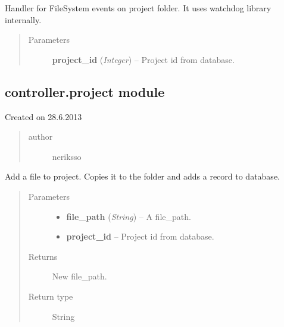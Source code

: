 \documentclass[letterpaper,10pt,english]{sphinxmanual}
\begin{document}
\begin{fulllineitems}
\label{controller:controller.handlers.PROJECT_EVENT_HANDLER}
Handler for FileSystem events on project folder.
It uses watchdog library internally.
\begin{quote}\begin{description}
\item[{Parameters}] \leavevmode
\textbf{project\_id} (\emph{Integer}) -- Project id from database.

\end{description}\end{quote}

\end{fulllineitems}



\subsection{controller.project module}
\label{controller:controller-project-module}\label{controller:module-controller.project}
Created on 28.6.2013
\begin{quote}\begin{description}
\item[{author}] \leavevmode
neriksso

\end{description}\end{quote}

\begin{fulllineitems}
\label{controller:controller.project.add_file_to_project}
Add a file to project. Copies it to the folder and adds a record to
database.
\begin{quote}\begin{description}
\item[{Parameters}] \leavevmode\begin{itemize}
\item {} 
\textbf{file\_path} (\emph{String}) -- A file\_path.

\item {} 
\textbf{project\_id} -- Project id from database.

\end{itemize}

\item[{Returns}] \leavevmode
New file\_path.

\item[{Return type}] \leavevmode
String

\end{description}\end{quote}

\end{fulllineitems}
\end{document}
